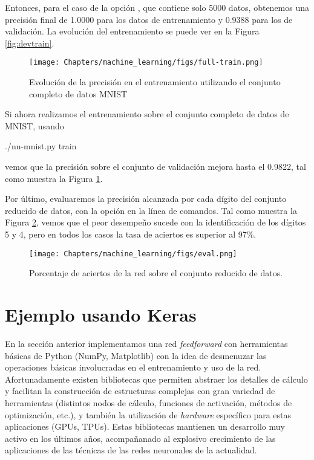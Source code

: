 
Entonces, para el caso de la opción , que contiene solo \num{5000} datos, obtenemos una precisión final de \num{1.0000} para los datos de entrenamiento y \num{0.9388} para los de validación. La evolución del entrenamiento se puede ver en la Figura \ref{fig:devtrain}.

\begin{figure}
    \begin{center}
        \texttt{[image: Chapters/machine\_learning/figs/full-train.png]}
    \end{center}
    \caption{Evolución de la precisión en el entrenamiento utilizando el conjunto completo de datos MNIST}
    \label{fig:fulltrain}
\end{figure}

Si ahora realizamos el entrenamiento sobre el conjunto completo de datos de MNIST, usando
\begin{shell}
./nn-mnist.py train
\end{shell}
vemos que la precisión sobre el conjunto de validación mejora hasta el \num{0.9822}, tal como muestra la Figura \ref{fig:fulltrain}.

Por último, evaluaremos la precisión alcanzada por cada dígito del conjunto reducido de datos, con la opción  en la línea de comandos. Tal como muestra la Figura \ref{fig:eval}, vemos que el peor desempeño sucede con la identificación de los dígitos 5 y 4, pero en todos los casos la tasa de aciertos es superior al 97\%.

\begin{figure}
    \begin{center}
        \texttt{[image: Chapters/machine\_learning/figs/eval.png]}
    \end{center}
    \caption{Porcentaje de aciertos de la red sobre el conjunto reducido de datos.}
    \label{fig:eval}
\end{figure}

\section{Ejemplo usando Keras}

En la sección anterior implementamos una red \textit{feedforward} con herramientas básicas de Python (NumPy, Matplotlib) con la idea de desmenuzar las operaciones básicas involucradas en el entrenamiento y uso de la red. Afortunadamente existen bibliotecas que permiten abstraer los detalles de cálculo y facilitan la construcción de estructuras complejas con gran variedad de herramientas (distintos nodos de cálculo, funciones de activación, métodos de optimización, etc.), y también la utilización de \textit{hardware} específico para estas aplicaciones (GPUs, TPUs). Estas bibliotecas mantienen un desarrollo muy activo en los últimos años, acompañanado al explosivo crecimiento de las aplicaciones de las técnicas de las redes neuronales de la actualidad.

